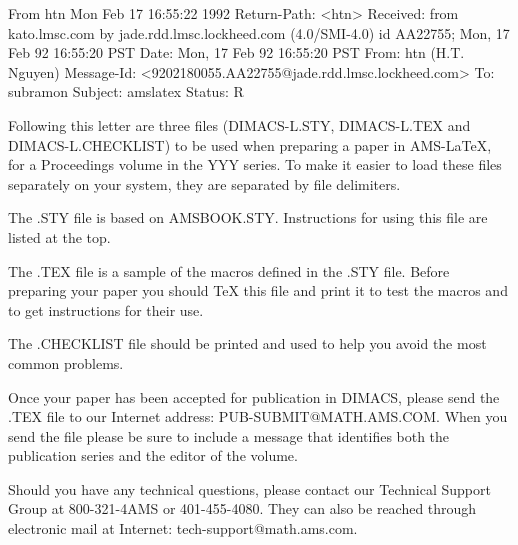 From htn Mon Feb 17 16:55:22 1992
Return-Path: <htn>
Received: from kato.lmsc.com by jade.rdd.lmsc.lockheed.com (4.0/SMI-4.0)
	id AA22755; Mon, 17 Feb 92 16:55:20 PST
Date: Mon, 17 Feb 92 16:55:20 PST
From: htn (H.T. Nguyen)
Message-Id: <9202180055.AA22755@jade.rdd.lmsc.lockheed.com>
To: subramon
Subject: amslatex
Status: R

Following this letter are three files (DIMACS-L.STY, DIMACS-L.TEX and
DIMACS-L.CHECKLIST) to be used when preparing a paper in AMS-LaTeX, for a
Proceedings volume in the YYY series.  To make it easier to load these
files separately on your system,  they are separated by file delimiters.

The .STY file is based on AMSBOOK.STY. Instructions for using this file are
listed at the top.

The .TEX file is a sample of the macros defined in the .STY file.  Before
preparing your paper you should TeX this file and print it to test the macros
and to get instructions for their use.

The .CHECKLIST file should be printed and used to help you avoid the most
common problems.

Once your paper has been accepted for publication in DIMACS, please send the
.TEX file to our Internet address: PUB-SUBMIT@MATH.AMS.COM.  When you send the
file please be sure to include a message that identifies both the publication
series and the editor of the volume.

Should you have any technical questions, please contact our Technical Support
Group at 800-321-4AMS or 401-455-4080.  They can also be reached through
electronic mail at Internet: tech-support@math.ams.com.

